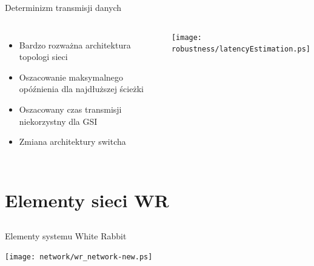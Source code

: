 \documentclass[compress,red]{beamer}
\begin{document}
\begin{frame}{Determinizm transmisji danych}


  \begin{columns}[c]

  

  \begin{itemize}
    \item Bardzo rozważna architektura topologi sieci
    \item Oszacowanie maksymalnego opóźnienia dla najdłuższej ścieżki
    \item Oszacowany czas transmisji niekorzystny dla GSI
    \item Zmiana architektury switcha
  \end{itemize}

  

      \begin{center}
      \texttt{[image: robustness/latencyEstimation.ps]}
      \end{center}

      

  \end{columns}


\end{frame}


\section{Elementy sieci WR}
\subsection{}
\begin{frame}{Elementy systemu White Rabbit}

      \begin{center}
      \texttt{[image: network/wr\_network-new.ps]}
      \end{center}

\end{frame}
\end{document}
